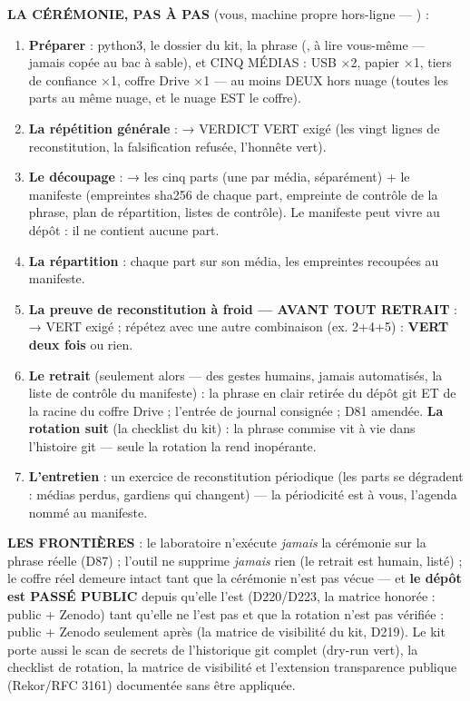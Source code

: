 \textbf{LA CÉRÉMONIE, PAS À PAS} (vous, machine propre hors-ligne —
) :

\begin{enumerate}
\item \textbf{Préparer} : python3, le dossier du kit, la phrase
(, à lire vous-même — jamais copée au bac
à sable), et CINQ MÉDIAS : USB ×2, papier ×1, tiers de confiance ×1,
coffre Drive ×1 — au moins DEUX hors nuage (toutes les parts au même
nuage, et le nuage EST le coffre).
\item \textbf{La répétition générale} :  → VERDICT VERT
exigé (les vingt lignes de reconstitution, la falsification refusée,
l'honnête vert).
\item \textbf{Le découpage} :  → les
cinq parts (une par média, séparément) + le manifeste (empreintes sha256
de chaque part, empreinte de contrôle de la phrase, plan de répartition,
listes de contrôle). Le manifeste peut vivre au dépôt : il ne contient
aucune part.
\item \textbf{La répartition} : chaque part sur son média, les empreintes
recoupées au manifeste.
\item \textbf{La preuve de reconstitution à froid — AVANT TOUT RETRAIT} :
 → VERT exigé ; répétez
avec une autre combinaison (ex. 2+4+5) : \textbf{VERT deux fois} ou rien.
\item \textbf{Le retrait} (seulement alors — des gestes humains, jamais
automatisés, la liste de contrôle du manifeste) : la phrase en clair
retirée du dépôt git ET de la racine du coffre Drive ; l'entrée de journal
consignée ; D81 amendée. \textbf{La rotation suit} (la checklist du kit) :
la phrase commise vit à vie dans l'histoire git — seule la rotation la
rend inopérante.
\item \textbf{L'entretien} : un exercice de reconstitution périodique (les
parts se dégradent : médias perdus, gardiens qui changent) — la périodicité
est à vous, l'agenda nommé au manifeste.
\end{enumerate}

\textbf{LES FRONTIÈRES} : le laboratoire n'exécute \emph{jamais} la
cérémonie sur la phrase réelle (D87) ; l'outil ne supprime \emph{jamais}
rien (le retrait est humain, listé) ; le coffre réel demeure intact tant
que la cérémonie n'est pas vécue — et \textbf{le dépôt est PASSÉ PUBLIC}
depuis qu'elle l'est (D220/D223, la matrice honorée : public + Zenodo)
tant qu'elle ne l'est pas et que la rotation n'est pas vérifiée : public +
Zenodo seulement après (la matrice de visibilité du kit, D219). Le kit
porte aussi le scan de secrets de l'historique git complet (dry-run vert),
la checklist de rotation, la matrice de visibilité et l'extension
transparence publique (Rekor/RFC 3161) documentée sans être appliquée.

